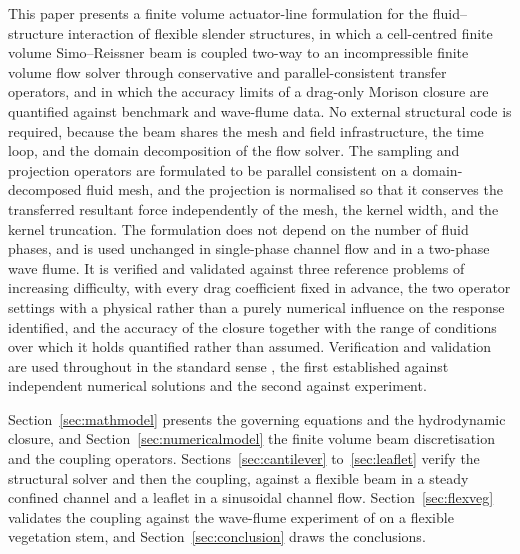 \noindent
This paper presents a finite volume actuator-line formulation for the fluid--structure interaction of flexible slender structures, in which a cell-centred finite volume Simo--Reissner beam is coupled two-way to an incompressible finite volume flow solver through conservative and parallel-consistent transfer operators, and in which the accuracy limits of a drag-only Morison closure are quantified against benchmark and wave-flume data. No external structural code is required, because the beam shares the mesh and field infrastructure, the time loop, and the domain decomposition of the flow solver. The sampling and projection operators are formulated to be parallel consistent on a domain-decomposed fluid mesh, and the projection is normalised so that it conserves the transferred resultant force independently of the mesh, the kernel width, and the kernel truncation. The formulation does not depend on the number of fluid phases, and is used unchanged in single-phase channel flow and in a two-phase wave flume. It is verified and validated against three reference problems of increasing difficulty, with every drag coefficient fixed in advance, the two operator settings with a physical rather than a purely numerical influence on the response identified, and the accuracy of the closure together with the range of conditions over which it holds quantified rather than assumed. Verification and validation are used throughout in the standard sense \citep{roache_quantification_1997,oberkampf_roy_2010}, the first established against independent numerical solutions and the second against experiment.

\noindent
Section~\ref{sec:mathmodel} presents the governing equations and the hydrodynamic closure, and Section~\ref{sec:numericalmodel} the finite volume beam discretisation and the coupling operators. Sections~\ref{sec:cantilever} to~\ref{sec:leaflet} verify the structural solver and then the coupling, against a flexible beam in a steady confined channel and a leaflet in a sinusoidal channel flow. Section~\ref{sec:flexveg} validates the coupling against the wave-flume experiment of \citet{jacobsen_waveinduced_2019} on a flexible vegetation stem, and Section~\ref{sec:conclusion} draws the conclusions.
